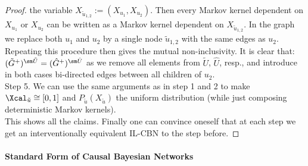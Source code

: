 \begin{Thm}
\begin{proof}
    the variable $X_{\tilde u_{1,2}} := (X_{u_1},X_{u_2})$. Then every Markov kernel dependent on $X_{u_1}$ or $X_{u_2}$ 
    can be written as a Markov kernel dependent on $X_{\tilde u_{1,2}}$.
    In the graph we replace both $u_1$ and $u_2$ by a single node $\tilde u_{1,2}$ with the same edges as $u_2$.
    Repeating this procedure then gives the mutual non-inclusivity. It is clear that:
    $(\tilde G^+)^{\sm \tilde U} = (\hat G^+)^{\sm \hat U}$ as we remove all elements from $\tilde U$, $\hat U$, resp., 
    and introduce in both cases bi-directed edges between all children of $u_2$.\\
    Step 5. We can use the same arguments as in step 1 and 2 to make 
    $\Xcal_{\tilde u} \cong [0,1]$ and $P_{\tilde u}(X_{\tilde u})$ the uniform distribution 
    (while just composing deterministic Markov kernels).\\
    This shows all the claims. Finally one can convince oneself that at each step we get an interventionally equivalent 
    IL-CBN to the step before. 
\end{proof}
\end{Thm}



\paragraph{Standard Form of Causal Bayesian Networks}



